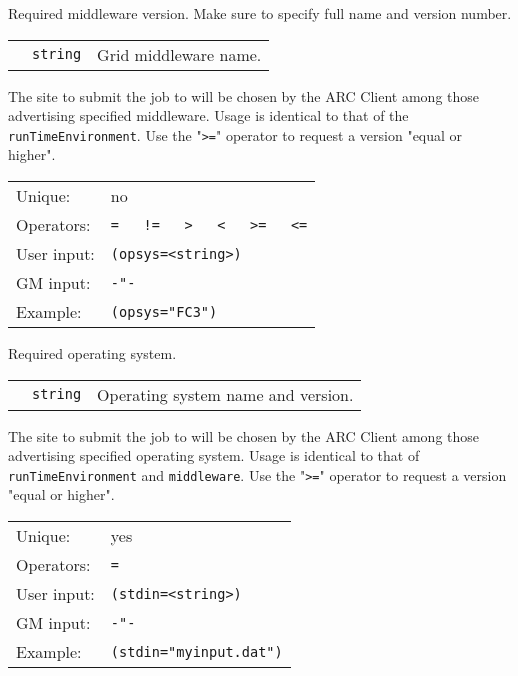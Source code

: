   Required middleware version. Make sure to specify full name and version number.

  \begin{tabular}{llp{10cm}}
    \hspace*{1cm}&\texttt{string} & Grid middleware name.\\
  \end{tabular}

  The site to submit the job to will be chosen by the ARC Client among those
  advertising specified middleware. Usage is identical to that of the
  \texttt{runTimeEnvironment}. Use the "\verb#>=#" operator to
  request a version "equal or higher".%

  \hspace*{0.5cm}
  \begin{shaded}
  \end{shaded}
  \begin{tabular}{lp{13cm}}
    Unique:&no\\
    Operators:&\verb#=   !=   >   <   >=   <=#\\
    User input:&\verb#(opsys=<string>)#\\
    GM input:&\verb#-"-#\\
    Example:&\verb#(opsys="FC3")#\\
  \end{tabular}

  Required operating system.

  \begin{tabular}{llp{10cm}}
    \hspace*{1cm}&\texttt{string} & Operating system name and version.\\
  \end{tabular}

  The site to submit the job to will be chosen by the ARC Client among those
  advertising specified operating system. Usage is identical to that of
  \texttt{runTimeEnvironment} and \texttt{middleware}. Use the "\verb#>=#" operator to
  request a version "equal or higher".

  \hspace*{0.5cm}
  \begin{shaded}
  \end{shaded}
  \begin{tabular}{lp{13cm}}
    Unique:&yes\\
    Operators:&\verb#=#\\
    User input:&\verb#(stdin=<string>)#\\
    GM input:&\verb#-"-#\\
    Example:&\verb#(stdin="myinput.dat")#\\
  \end{tabular}

